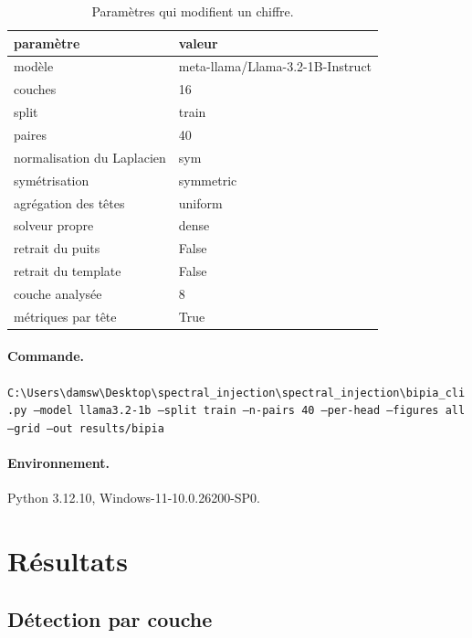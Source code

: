 \documentclass[11pt,a4paper]{article}
\begin{document}
\begin{table}[htbp]\centering\small
\begin{tabular}{ll}
\hline
paramètre & valeur \\
\hline
modèle & meta-llama/Llama-3.2-1B-Instruct \\
couches & 16 \\
split & train \\
paires & 40 \\
normalisation du Laplacien & sym \\
symétrisation & symmetric \\
agrégation des têtes & uniform \\
solveur propre & dense \\
retrait du puits & False \\
retrait du template & False \\
couche analysée & 8 \\
métriques par tête & True \\
\hline
\end{tabular}
\caption{Paramètres qui modifient un chiffre.}
\label{tab:config}
\end{table}


\paragraph{Commande.}
\texttt{C:\textbackslash{}Users\textbackslash{}damsw\textbackslash{}Desktop\textbackslash{}spectral\_injection\textbackslash{}spectral\_injection\textbackslash{}bipia\_cli.py --model llama3.2-1b --split train --n-pairs 40 --per-head --figures all --grid --out results/bipia}

\paragraph{Environnement.}
Python 3.12.10, Windows-11-10.0.26200-SP0.


\section{Résultats}

\subsection{Détection par couche}
\end{document}
